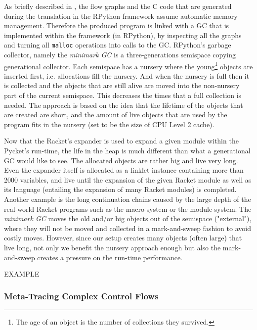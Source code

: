 As briefly described in , the flow graphs and
the C code that are generated during the translation in the RPython
framework assume automatic memory management. Therefore the produced
program is linked with a GC that is implemented within the framework
(in RPython), by inspecting all the graphs and turning all
\texttt{malloc} operations into calls to the GC. RPython's garbage
collector, namely the \emph{minimark GC} is a three-generations
semispace copying generational collector. Each semispace has a nursery
where the young\footnote{The age of an object is the number of
  collections they survived.}  objects are inserted first,
i.e. allocations fill the nursery. And when the nursery is full then
it is collected and the objects that are still alive are moved into
the non-nursery part of the current semispace. This decreases the
times that a full collection is needed. The approach is based on the
idea that the lifetime of the objects that are created are short, and
the amount of live objects that are used by the program fits in the
nursery (set to be the size of CPU Level 2 cache). \cite{pypy06,
  bolz:14, gc:16, gc:12}

Now that the Racket's expander is used to expand a given module within
the Pycket's run-time, the life in the heap is much different than
what a generational GC would like to see. The allocated objects are
rather big and live very long. Even the expander itself is allocated
as a linklet instance containing more than 2000 variables, and live
until the expansion of the given Racket module as well as its language
(entailing the expansion of many Racket modules) is completed. Another
example is the long continuation chains caused by the large depth of
the real-world Racket programs such as the macro-system or the
module-system. The \emph{minimark GC} moves the old and/or big objects
out of the semispace ("external"), where they will not be moved and
collected in a mark-and-sweep fashion to avoid costly moves. However,
since our setup creates many objects (often large) that live long, not
only we benefit the nursery approach enough but also the
mark-and-sweep creates a pressure on the run-time performance.

EXAMPLE

\subsubsection{Meta-Tracing Complex Control Flows}

